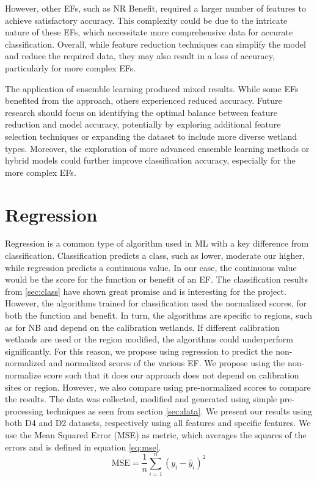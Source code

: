 \documentclass[12pt,letterpaper]{article}
\begin{document}
However, other \acp{EF}, such as \ac{NR} Benefit, required a larger number of features to achieve satisfactory accuracy.
This complexity could be due to the intricate nature of these \acp{EF}, which necessitate more comprehensive data for accurate classification.
Overall, while feature reduction techniques can simplify the model and reduce the required data, they may also result in a loss of accuracy, particularly for more complex \acp{EF}.

The application of ensemble learning produced mixed results. While some \acp{EF} benefited from the approach, others experienced reduced accuracy.
Future research should focus on identifying the optimal balance between feature reduction and model accuracy, potentially by exploring additional feature selection techniques or expanding the dataset to include more diverse wetland types.
Moreover, the exploration of more advanced ensemble learning methods or hybrid models could further improve classification accuracy, especially for the more complex \acp{EF}.




\section{Regression}\label{sec:regression}
Regression is a common type of algorithm used in \ac{ML} with a key difference from classification.
Classification predicts a class, such as lower, moderate our higher, while regression predicts a continuous value.
In our case, the continuous value would be the score for the function or benefit of an \ac{EF}.
The classification results from \ref{sec:class} have shown great promise and is interesting for the project.
However, the algorithms trained for classification used the normalized scores, for both the function and benefit.
In turn, the algorithms are specific to regions, such as for NB and depend on the calibration wetlands.
If different calibration wetlands are used or the region modified, the algorithms could underperform significantly.
For this reason, we propose using regression to predict the non-normalized and normalized scores of the various \ac{EF}.
We propose using the non-normalize score such that it does our approach does not depend on calibration sites or region.
However, we also compare using pre-normalized scores to compare the results.
The data was collected, modified and generated using simple pre-processing techniques as seen from section \ref{sec:data}.
We present our results using both D4 and D2 datasets, respectively using all features and specific features.
We use the Mean Squared Error (MSE) as metric, which averages the squares of the errors and is defined in equation \ref{eq:mse}.
\begin{equation}
\text{MSE} = \frac{1}{n} \sum_{i=1}^n (y_i - \hat{y}_i)^2
\label{eq:mse}
\end{equation}
\end{document}
